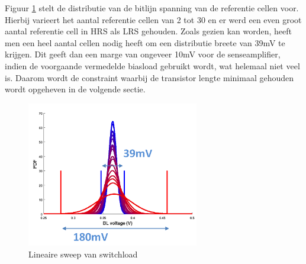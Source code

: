 Figuur \ref{fig:distref} stelt de distributie van de bitlijn spanning van de referentie cellen voor. Hierbij varieert het aantal referentie cellen van 2 tot 30 en er werd een even groot aantal referentie cell in HRS als LRS gehouden. Zoals gezien kan worden, heeft men een heel aantal cellen nodig heeft om een distributie breete van 39mV te krijgen. Dit geeft dan een marge van ongeveer 10mV voor de senseamplifier, indien de voorgaande vermedelde biasload gebruikt wordt, wat helemaal niet veel is. Daarom wordt de constraint waarbij de transistor lengte minimaal gehouden wordt opgeheven in de volgende sectie.

\begin{figure}[!ht]
  \centering
  \includegraphics[width=0.67\textwidth]{../fig/hfdst-last-ref.png}
  \caption{Lineaire sweep van switchload}
  \label{fig:distref}
\end{figure}


